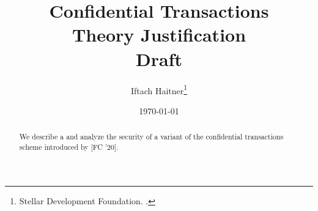 \documentclass[11pt]{article}
\title{Confidential Transactions  \\ Theory Justification \\
\Large Draft}
\author{Iftach Haitner\thanks{Stellar Development Foundation. \email{ iftach.haitner@stellar.org}.}}
\date{\today}
\begin{document}
 
 \sloppy
 
  
\maketitle


\begin{abstract}
We describe a and analyze the security of  a variant of the confidential transactions   scheme introduced by  \citeauthor {BunzAZB20} [FC '20]. 
\end{abstract}

\tableofcontents
\newpage 







\printbibliography
\end{document}
